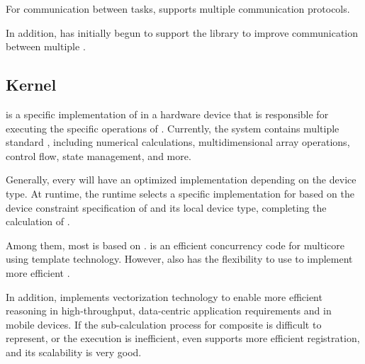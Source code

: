 \begin{content}
\begin{enum}
\end{enum}

For communication between tasks, \tf{} supports multiple communication protocols.

\begin{enum}
\end{enum}

In addition, \tf{} has initially begun to support the  library to improve communication between multiple .


\subsection{Kernel}
 is a specific implementation of  in a hardware device that is responsible for executing the specific operations of . Currently, the  system contains  multiple standard , including numerical calculations, multidimensional array operations, control flow, state management, and more.

Generally, every  will have an optimized  implementation depending on the device type. At runtime, the runtime selects a specific  implementation for  based on the device constraint specification of  and its local device type, completing the calculation of .

Among them, most  is based on .  is an efficient concurrency code for multicore  using  template technology. However,  also has the flexibility to use  to implement more efficient .

In addition,  implements vectorization technology to enable more efficient reasoning in high-throughput, data-centric application requirements and in mobile devices. If the sub-calculation process for composite  is difficult to represent, or the execution is inefficient,  even supports more efficient  registration, and its scalability is very good.

\end{content}


